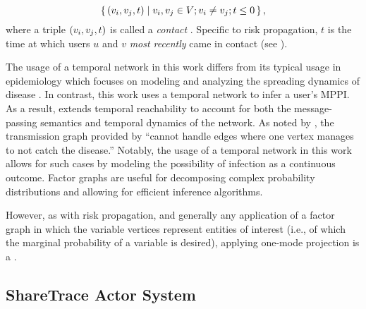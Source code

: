 \begin{equation}
    \setBuilder{(\vVariable[i], \vVariable[j], t)}{\vVariable[i], \vVariable[j] \in \vVariables; \vVariable[i] \neq \vVariable[j]; t \leq 0}, \label{eq:contact-seq}
\end{equation}
%
where a triple $(\vVariable[i], \vVariable[j], t)$ is called a \emph{contact} \cite{Holme2012}. Specific to risk propagation, $t$ is the time at which users $u$ and $v$ \emph{most recently} came in contact (see ).

The usage of a temporal network in this work differs from its typical usage in epidemiology which focuses on modeling and analyzing the spreading dynamics of disease \cite{Riolo2001, Danon2011, Lokhov2014, Craft2015, Pastor-Satorras2015, Koher2019, Zino2021}. In contrast, this work uses a temporal network to infer a user's MPPI. As a result,  extends temporal reachability to account for both the message-passing semantics and temporal dynamics of the network. As noted by \cite{Holme2012}, the transmission graph provided by \cite{Riolo2001} ``cannot handle edges where one vertex manages to not catch the disease.'' Notably, the usage of a temporal network in this work allows for such cases by modeling the possibility of infection as a continuous outcome.
Factor graphs are useful for decomposing complex probability distributions and allowing for efficient inference algorithms.

However, as with risk propagation, and generally any application of a factor graph in which the variable vertices represent entities of interest (i.e., of which the marginal probability of a variable is desired), applying one-mode projection is a .

\subsection{ShareTrace Actor System}

